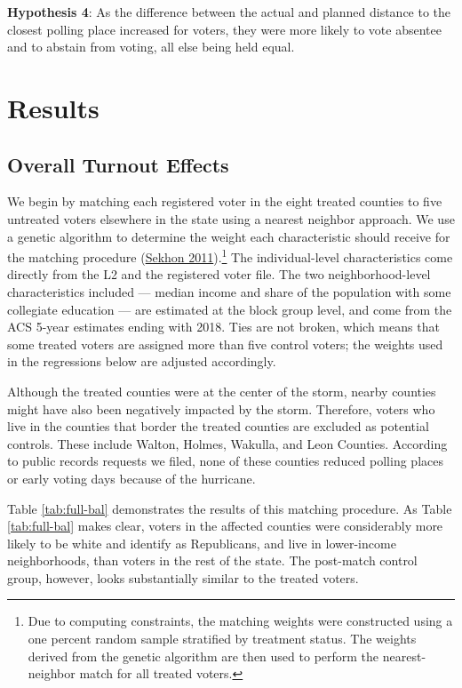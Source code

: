 \documentclass[
  12pt,
]{article}
\begin{document}
\textbf{Hypothesis 4}: As the difference between the actual and planned distance to the closest polling place increased for voters, they were more likely to vote absentee and to abstain from voting, all else being held equal.

\hypertarget{results}{%
\section*{Results}\label{results}}

\hypertarget{overall-turnout-effects}{%
\subsection*{Overall Turnout Effects}\label{overall-turnout-effects}}

We begin by matching each registered voter in the eight treated counties to five untreated voters elsewhere in the state using a nearest neighbor approach. We use a genetic algorithm to determine the weight each characteristic should receive for the matching procedure (\protect\hyperlink{ref-Sekhon2011}{Sekhon 2011}).\footnote{Due to computing constraints, the matching weights were constructed using a one percent random sample stratified by treatment status. The weights derived from the genetic algorithm are then used to perform the nearest-neighbor match for all treated voters.} The individual-level characteristics come directly from the L2 and the registered voter file. The two neighborhood-level characteristics included --- median income and share of the population with some collegiate education --- are estimated at the block group level, and come from the ACS 5-year estimates ending with 2018. Ties are not broken, which means that some treated voters are assigned more than five control voters; the weights used in the regressions below are adjusted accordingly.

Although the treated counties were at the center of the storm, nearby counties might have also been negatively impacted by the storm. Therefore, voters who live in the counties that border the treated counties are excluded as potential controls. These include Walton, Holmes, Wakulla, and Leon Counties. According to public records requests we filed, none of these counties reduced polling places or early voting days because of the hurricane.

Table \ref{tab:full-bal} demonstrates the results of this matching procedure. As Table \ref{tab:full-bal} makes clear, voters in the affected counties were considerably more likely to be white and identify as Republicans, and live in lower-income neighborhoods, than voters in the rest of the state. The post-match control group, however, looks substantially similar to the treated voters.
\end{document}
